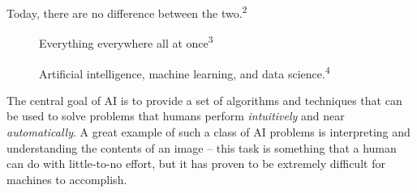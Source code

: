 \documentclass[
  paper=6in:9in,
  pagesize=pdftex,
  headinclude=on,
  footinclude=on,
  12pt]{scrbook}
\begin{document}
Today, there are no difference between the two.\textsuperscript{2}

\begin{figure}[H]


\caption{\label{fig-semua}Everything everywhere all at
once\textsuperscript{3}}

\end{figure}%

\begin{figure}[H]


\caption{\label{fig-ml-kaitan}Artificial intelligence, machine learning,
and data science.\textsuperscript{4}}

\end{figure}%

The central goal of AI is to provide a set of algorithms and techniques
that can be used to solve problems that humans perform
\emph{intuitively} and near \emph{automatically}. A great example of
such a class of AI problems is interpreting and understanding the
contents of an image -- this task is something that a human can do with
little-to-no effort, but it has proven to be extremely difficult for
machines to accomplish.
\end{document}
